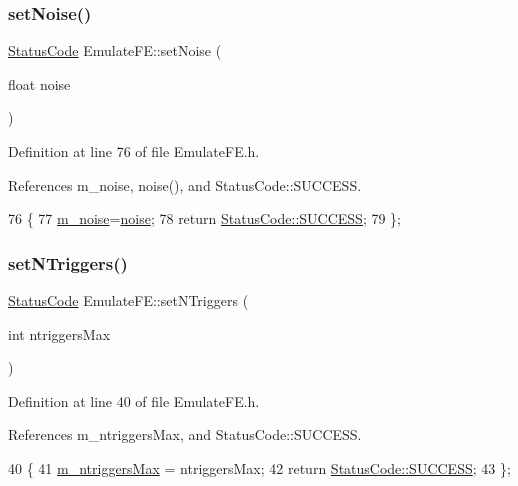 \subsubsection{\texorpdfstring{set\+Noise()}{setNoise()}}
{\footnotesize\ttfamily \hyperlink{classStatusCode}{Status\+Code} Emulate\+F\+E\+::set\+Noise (\begin{DoxyParamCaption}\item[{float}]{noise }\end{DoxyParamCaption})\hspace{0.3cm}{\ttfamily [inline]}}



Definition at line 76 of file Emulate\+F\+E.\+h.



References m\+\_\+noise, noise(), and Status\+Code\+::\+S\+U\+C\+C\+E\+SS.


\begin{DoxyCode}
76                                    \{
77     \hyperlink{classEmulateFE_a74f8720a1da5806fad3811339ef9b98f}{m\_noise}=\hyperlink{classEmulateFE_a3e1a2e88567bf16a5599a1602d6ba50d}{noise};
78     \textcolor{keywordflow}{return} \hyperlink{classStatusCode_a6f565cbeadc76d14c72f047e5e85eb4badd0da38d3ba0d922efd1f4619bc37ad8}{StatusCode::SUCCESS};
79   \};
\end{DoxyCode}
\mbox{\label{classEmulateFE_a3a8b53c47db627e5a70076968d5aab53}} 
\subsubsection{\texorpdfstring{set\+N\+Triggers()}{setNTriggers()}}
{\footnotesize\ttfamily \hyperlink{classStatusCode}{Status\+Code} Emulate\+F\+E\+::set\+N\+Triggers (\begin{DoxyParamCaption}\item[{int}]{ntriggers\+Max }\end{DoxyParamCaption})\hspace{0.3cm}{\ttfamily [inline]}}



Definition at line 40 of file Emulate\+F\+E.\+h.



References m\+\_\+ntriggers\+Max, and Status\+Code\+::\+S\+U\+C\+C\+E\+SS.


\begin{DoxyCode}
40                                             \{
41     \hyperlink{classEmulateFE_a2d473d12faf30f4870458874d70c7f55}{m\_ntriggersMax} = ntriggersMax;
42     \textcolor{keywordflow}{return} \hyperlink{classStatusCode_a6f565cbeadc76d14c72f047e5e85eb4badd0da38d3ba0d922efd1f4619bc37ad8}{StatusCode::SUCCESS};
43   \};
\end{DoxyCode}
\mbox{\label{classEmulateFE_a6328b50231c29fc5a7e6df99a3db3a29}} 
